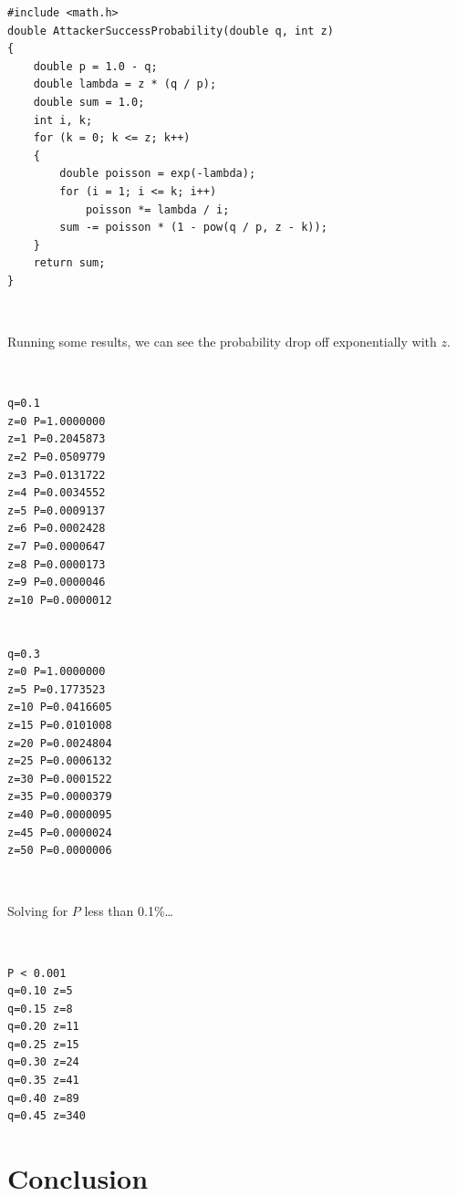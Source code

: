\documentclass[nohyper]{tufte-handout}
\begin{document}
\begin{lstlisting}
#include <math.h>
double AttackerSuccessProbability(double q, int z)
{
    double p = 1.0 - q;
    double lambda = z * (q / p);
    double sum = 1.0;
    int i, k;
    for (k = 0; k <= z; k++)
    {
        double poisson = exp(-lambda);
        for (i = 1; i <= k; i++)
            poisson *= lambda / i;
        sum -= poisson * (1 - pow(q / p, z - k));
    }
    return sum;
}
\end{lstlisting}

\

Running some results, we can see the probability drop off exponentially
with $z$.

\

\begin{verbatim}
q=0.1
z=0 P=1.0000000
z=1 P=0.2045873
z=2 P=0.0509779
z=3 P=0.0131722
z=4 P=0.0034552
z=5 P=0.0009137
z=6 P=0.0002428
z=7 P=0.0000647
z=8 P=0.0000173
z=9 P=0.0000046
z=10 P=0.0000012


q=0.3
z=0 P=1.0000000
z=5 P=0.1773523
z=10 P=0.0416605
z=15 P=0.0101008
z=20 P=0.0024804
z=25 P=0.0006132
z=30 P=0.0001522
z=35 P=0.0000379
z=40 P=0.0000095
z=45 P=0.0000024
z=50 P=0.0000006
\end{verbatim}

\

Solving for $P$ less than 0.1\%\ldots{}

\

\begin{verbatim}
P < 0.001
q=0.10 z=5
q=0.15 z=8
q=0.20 z=11
q=0.25 z=15
q=0.30 z=24
q=0.35 z=41
q=0.40 z=89
q=0.45 z=340
\end{verbatim}


\section{Conclusion}\label{conclusion}
\end{document}
